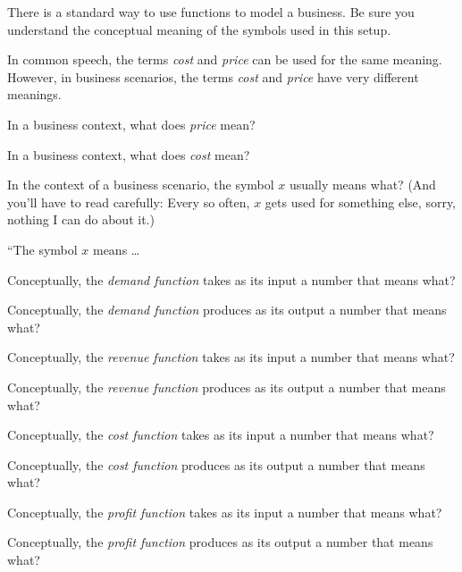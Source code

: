 
There is a standard way to use functions to model a business.
Be sure you understand the conceptual meaning of the symbols used in this setup.

\begin{ProblemSet}
 \begin{Problem}
  In common speech, the terms \emph{cost} and \emph{price} can be used for the same meaning.
  However, in business scenarios, the terms \emph{cost} and \emph{price} have very different meanings.

  In a business context, what does \emph{price} mean?
 \end{Problem}
 \begin{Problem}
  In a business context, what does \emph{cost} mean?
 \end{Problem}
 \begin{Problem}
  In the context of a business scenario, the symbol $x$ usually means what?
  (And you'll have to read carefully:
  Every so often, $x$ gets used for something else, sorry, nothing I can do about it.)

  ``The symbol $x$ means \dots
 \end{Problem}
 \begin{Problem}
  Conceptually, the \emph{demand function} takes as its input a number that means what?
 \end{Problem}
 \begin{Problem}
  Conceptually, the \emph{demand function} produces as its output a number that means what?
 \end{Problem}
 \begin{Problem}
  Conceptually, the \emph{revenue function} takes as its input a number that means what?
 \end{Problem}
 \begin{Problem}
  Conceptually, the \emph{revenue function} produces as its output a number that means what?
 \end{Problem}
 \begin{Problem}
  Conceptually, the \emph{cost function} takes as its input a number that means what?
 \end{Problem}
 \begin{Problem}
  Conceptually, the \emph{cost function} produces as its output a number that means what?
 \end{Problem}
 \begin{Problem}
  Conceptually, the \emph{profit function} takes as its input a number that means what?
 \end{Problem}
 \begin{Problem}
  Conceptually, the \emph{profit function} produces as its output a number that means what?
 \end{Problem}


\end{ProblemSet}
